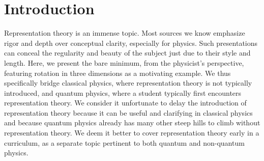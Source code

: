 
\chapter{Introduction} 
\noindent Representation theory is an immense topic. Most sources we know
emphasize rigor and depth over conceptual clarity, especially for physics. Such
presentations can conceal the regularity and beauty of the subject just due to
their style and length. Here, we present the bare minimum, from the physicist's
perspective, featuring rotation in three dimensions as a motivating example. We
thus specifically bridge classical physics, where representation theory is not
typically introduced, and quantum physics, where a student typically first
encounters representation theory. We consider it unfortunate to delay the
introduction of representation theory because it can be useful and clarifying
in classical physics and because quantum physics already has many other steep
hills to climb without representation theory. We deem it better to cover
representation theory early in a curriculum, as a separate topic pertinent to
both quantum and non-quantum physics.
